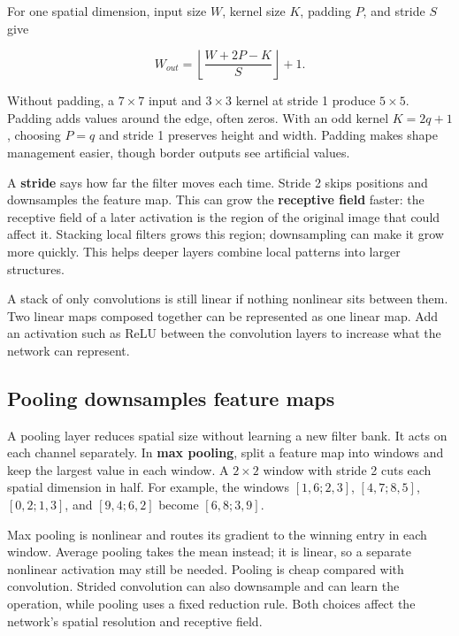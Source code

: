 For one spatial dimension, input size \(W\), kernel size \(K\), padding \(P\), and stride \(S\) give

\[W_{out}=\left\lfloor\frac{W+2P-K}{S}\right\rfloor+1.\]

Without padding, a \(7\times7\) input and \(3\times3\) kernel at stride 1 produce \(5\times5\). Padding adds values around the edge, often zeros. With an odd kernel \(K=2q+1\), choosing \(P=q\) and stride 1 preserves height and width. Padding makes shape management easier, though border outputs see artificial values.

A \textbf{stride} says how far the filter moves each time. Stride 2 skips positions and downsamples the feature map. This can grow the \textbf{receptive field} faster: the receptive field of a later activation is the region of the original image that could affect it. Stacking local filters grows this region; downsampling can make it grow more quickly. This helps deeper layers combine local patterns into larger structures.

A stack of only convolutions is still linear if nothing nonlinear sits between them. Two linear maps composed together can be represented as one linear map. Add an activation such as ReLU between the convolution layers to increase what the network can represent.

\subsection{Pooling downsamples feature maps}\label{04-visual-computing-ii-ch031-pooling-downsamples-feature-maps}

\hypertarget{04-visual-computing-ii-ch031-pooling-downsamples-feature-maps}{}

A pooling layer reduces spatial size without learning a new filter bank. It acts on each channel separately. In \textbf{max pooling}, split a feature map into windows and keep the largest value in each window. A \(2\times2\) window with stride 2 cuts each spatial dimension in half. For example, the windows \([1,6;2,3]\), \([4,7;8,5]\), \([0,2;1,3]\), and \([9,4;6,2]\) become \([6,8;3,9]\).

Max pooling is nonlinear and routes its gradient to the winning entry in each window. Average pooling takes the mean instead; it is linear, so a separate nonlinear activation may still be needed. Pooling is cheap compared with convolution. Strided convolution can also downsample and can learn the operation, while pooling uses a fixed reduction rule. Both choices affect the network's spatial resolution and receptive field.

